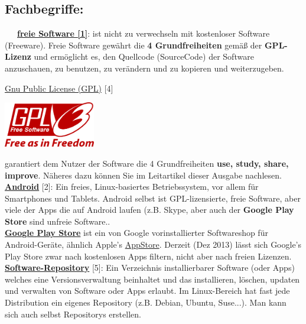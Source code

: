 \subsection*{Fachbegriffe:}

~~~\href{http://de.wikipedia.org/wiki/Freie_Software}{\textbf{freie Software [1]}}: ist nicht zu verwechseln mit kostenloser Software (Freeware). Freie Software gewährt die \textbf{4 Grundfreiheiten} gemäß der \textbf{GPL-Lizenz} und ermöglicht es, den Quellcode (SourceCode) der Software anzuschauen, zu benutzen, zu verändern und zu kopieren und weiterzugeben.

\href{http://de.wikipedia.org/wiki/GNU_General_Public_License}{Gnu Public License (GPL)} [4]
\begin{center}
\includegraphics[width=4cm]{fdroid/fdroid_gpl_logo.png}
\end{center}
garantiert dem Nutzer der Software die 4 Grundfreiheiten \textbf{use, study, share, improve}. Näheres dazu können Sie im Leitartikel dieser Ausgabe nachlesen. \\

\href{http://www.android.com/}{\textbf{Android}} [2]: Ein freies, Linux-basiertes Betriebssystem, vor allem für Smartphones und Tablets. Android selbst ist GPL-lizensierte, freie Software, aber viele der Apps die auf Android laufen (z.B. Skype, aber auch der \textbf{Google Play Store} sind unfreie Software.. \\

\href{http://de.wikipedia.org/wiki/Google_Play}{\textbf{Google Play Store}} ist ein von Google vorinstallierter Softwareshop für Android-Geräte, ähnlich Apple's \href{http://de.wikipedia.org/wiki/AppStore}{AppStore}. Derzeit (Dez 2013) lässt sich Google's Play Store zwar nach kostenlosen Apps filtern, nicht aber nach freien Lizenzen. \\

\href{http://de.wikipedia.org/wiki/Repository}{\textbf{Software-Repository}} [5]: Ein Verzeichnis installierbarer Software (oder Apps) welches eine Versionsverwaltung beinhaltet und das installieren, löschen, updaten und verwalten von Software oder Apps erlaubt. Im Linux-Bereich hat fast jede Distribution ein eigenes Repository (z.B. Debian, Ubuntu, Suse...). Man kann sich auch selbst Repositorys erstellen. \\

